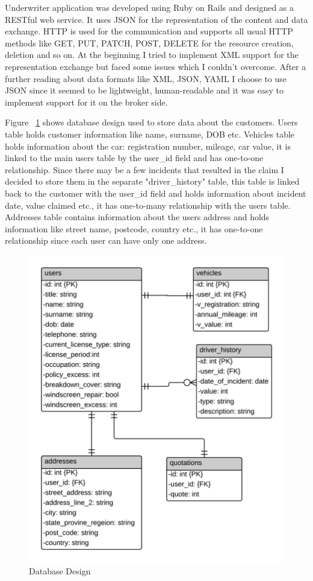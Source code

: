 \documentclass[10pt,a4paper,headinclude=true,twoside]{report}
\begin{document}
Underwriter application was developed using Ruby on Rails and designed as a RESTful web service. It uses JSON for the representation of the content and data exchange. HTTP is used for the communication and supports all usual HTTP methods like GET, PUT, PATCH, POST, DELETE for the resource creation, deletion and so on. At the beginning I tried to implement XML support for the representation exchange but faced some issues which I couldn't overcome. After a further reading about data formats like XML, JSON, YAML I choose to use JSON since it seemed to be lightweight, human-readable and it was easy to implement support for it on the broker side.

Figure ~\ref{fig:DatabaseDesign} shows database design used to store data about the customers. Users table holds customer information like name, surname, DOB etc. Vehicles table holds information about the car: registration number, mileage, car value, it is linked to the main users table by the user\_id field and has one-to-one relationship. Since there may be a few incidents that resulted in the claim I decided to store them in the separate "driver\_history" table, this table is linked back to the customer with the user\_id field and holds information about incident date, value claimed etc., it has one-to-many relationship with the users table. Addresses table contains information about the users address and holds information like street name, postcode, country etc., it has one-to-one relationship since each user can have only one address.  

\begin{figure}[H]
\centering
\centerline{\includegraphics[scale=0.198]{./DatabaseDesign}}
\caption{Database Design}
\label{fig:DatabaseDesign}
\end{figure}
\end{document}
